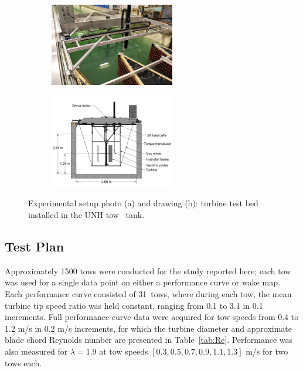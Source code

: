 \documentclass[energies,article,accept,moreauthors,pdftex,10pt,a4paper]{mdpi}
\theoremstyle{mdpi}
\newcounter{ex}
\newcounter{re}
\begin{document}
\begin{figure}[H]
    \centering
    \begin{subfigure}[t]{\textwidth}
        \centering
        \includegraphics[width=0.6\textwidth]{figures/exp-setup-photo}
        \caption{}
        \label{fig:exp-setup-photo}
    \end{subfigure}

    \begin{subfigure}[t]{\textwidth}
        \centering
        \includegraphics[width=0.6\textwidth]{figures/exp_setup_drawing}
        \caption{}
        \label{fig:exp-setup-dwg}
    \end{subfigure}
    
    \caption{Experimental setup photo (a) and drawing (b): turbine test bed
        installed in the UNH tow~ tank.}
 
    \label{fig:exp-setup}
\end{figure}


\subsection{Test Plan}

Approximately 1500 tows were conducted for the study reported here; each tow was
used for a single data point on either a performance curve or wake map. Each
performance curve consisted of 31~tows, where during each tow, the mean turbine
tip speed ratio was held constant, ranging from 0.1 to 3.1 in 0.1 increments.
Full performance curve data were acquired for tow speeds from 0.4 to 1.2 m/s in
0.2 m/s increments, for which the turbine diameter and approximate blade chord
Reynolds number are presented in Table~\ref{tab:Re}. Performance was also
measured for $\lambda=1.9$ at tow speeds $[0.3, 0.5, 0.7, 0.9, 1.1, 1.3]$ m/s
for two tows each.
\end{document}

